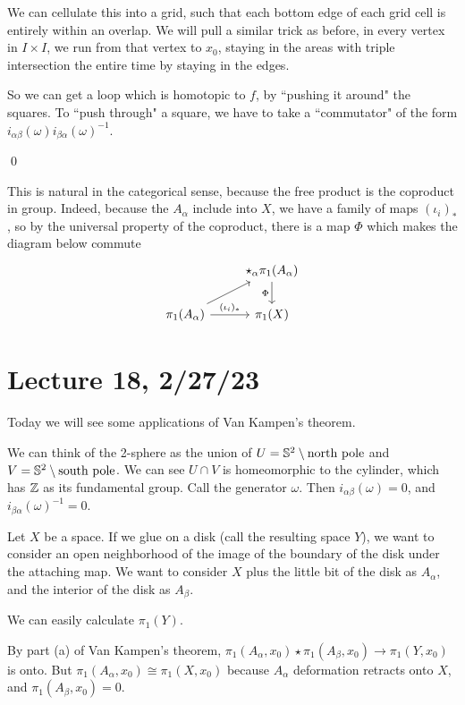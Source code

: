 \documentclass[x11names,reqno,14pt]{extarticle}
\begin{document}
\begin{enumerate}
We can cellulate this into a grid, such that each bottom edge of each grid cell is entirely within an overlap. We will pull a similar trick as before, in every vertex in $I \times I$, we run from that vertex to $x_0$, staying in the areas with triple intersection the entire time by staying in the edges.

So we can get a loop which is homotopic to $f$, by ``pushing it around" the squares. To ``push through" a square, we have to take a ``commutator" of the form $i_{\alpha\beta}(\omega)i_{\beta\alpha}(\omega)^{-1}$. 

\end{enumerate}

\qed

\rem

This is natural in the categorical sense, because the free product is the coproduct in group. Indeed, because the $A_\alpha$ include into $X$, we have a family of maps $(\iota_i)_*$, so by the universal property of the coproduct, there is a map $\Phi$ which makes the diagram below commute
\[
\begin{tikzcd}
& \star_\alpha\pi_1(A_\alpha)\ar[d, "\Phi"'] \\
\pi_1(A_\alpha)\ar[r, "(\iota_i)_*"] \ar[ur]& \pi_1(X)
\end{tikzcd}
\]

\section*{Lecture 18, 2/27/23}

Today we will see some applications of Van Kampen's theorem.  

\exm

We can think of the 2-sphere as the union of $U = \mathbb{S}^2\setminus\text{north pole}$ and $V = \mathbb{S}^2\setminus\text{south pole}$. We can see $U \cap V$ is homeomorphic to the cylinder, which has $\mathbb{Z}$ as its fundamental group. Call the generator $\omega$. Then $i_{\alpha\beta}(\omega) = 0$, and $i_{\beta\alpha}(\omega)^{-1} = 0$. 


Let $X$ be a space. If we glue on a disk (call the resulting space $Y$), we want to consider an open neighborhood of the image of the boundary of the disk under the attaching map. We want to consider $X$ plus the little bit of the disk as $A_\alpha$, and the interior of the disk as $A_\beta$. 

We can easily calculate $\pi_1(Y)$. 

By part (a) of Van Kampen's theorem, $\pi_1(A_\alpha,x_0) \star \pi_1(A_\beta, x_0)\to\pi_1(Y, x_0)$ is onto. But $\pi_1(A_\alpha, x_0) \cong \pi_1(X, x_0)$ because $A_\alpha$ deformation retracts onto $X$, and $\pi_1(A_\beta,x_0) = 0$. 
\end{document}
